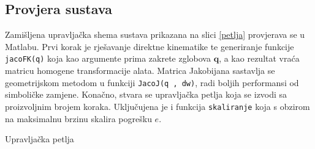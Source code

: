 \documentclass[times, utf8, diplomski, numeric]{fer}
\begin{document}
\subsection{Provjera sustava}\label{provjera}
Zamišljena upravljačka shema sustava prikazana na slici \ref{petlja} provjerava se u Matlabu.
Prvi korak je rješavanje direktne kinematike te generiranje funkcije \texttt{jacoFK(q)} koja kao argumente prima zakrete zglobova $\mathbf{q}$,
a kao rezultat vraća matricu homogene transformacije alata.
Matrica Jakobijana sastavlja se geometrijskom metodom u funkciji \texttt{JacoJ(q , dw)}, radi boljih performansi od simboličke zamjene.
Konačno, stvara se upravljačka petlja koja se izvodi sa proizvoljnim brojem koraka.  Uključujena je i funkcija \texttt{skaliranje} koja s obzirom na maksimalnu brzinu skalira pogrešku $e$.
\begin{algorithm}[H]
\caption{Upravljačka petlja}
\begin{algorithmic}
\ENDFOR
\end{algorithmic}
\end{algorithm}
\end{document}
